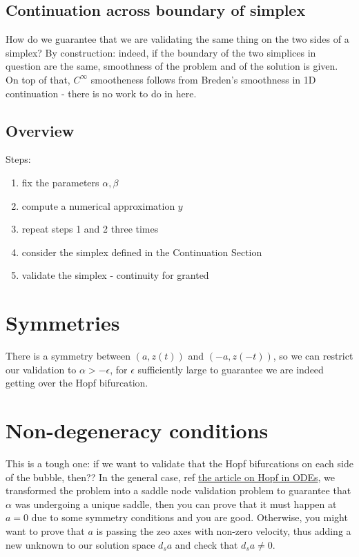 \documentclass[10pt]{article}
\begin{document}
\subsection{Continuation across boundary of simplex}

How do we guarantee that we are validating the same thing on the two sides of a simplex? By construction: indeed, if the boundary of the two simplices in question are the same, smoothness of the problem and of the solution is given. On top of that, $C^\infty$ smootheness follows from Breden's smoothness in 1D continuation - there is no work to do in here.

\subsection{Overview}
Steps:
\begin{enumerate}
\item fix the parameters $\alpha, \beta$
\item compute a numerical approximation $y$
\item repeat steps 1 and 2 three times
\item consider the simplex defined in the Continuation Section
\item validate the simplex - continuity for granted
\end{enumerate}

\section{Symmetries}

There is a symmetry between $(a,z(t))$ and $(-a, z(-t))$, so we can restrict our validation to $\alpha > -\epsilon$, for $\epsilon$ sufficiently large to guarantee we are indeed getting over the Hopf bifurcation.

\section{Non-degeneracy conditions}

This is a tough one: if we want to validate that the Hopf bifurcations on each side of the bubble, then?? 
In the general case, ref \href{https://epubs.siam.org/doi/pdf/10.1137/20M1343464?casa_token=pO4509x3vWEAAAAA:1CsI4Dv_VDrGRcJRzTN_VfHL3K2n7GbjUf3Qj8i2yiqs1rBzky5ugliIthu_hvpiJ8a2nSwp6Q}{the article on Hopf in ODEs}, we transformed the problem into a saddle node validation problem to guarantee that $\alpha$ was undergoing a unique saddle, then you can prove that it must happen at $a=0$ due to some symmetry conditions and you are good. Otherwise, you might want to prove that $a$ is passing the zeo axes with non-zero velocity, thus adding a new unknown to our solution space $d_s a$ and check that $d_s a\neq 0$.
\end{document}
